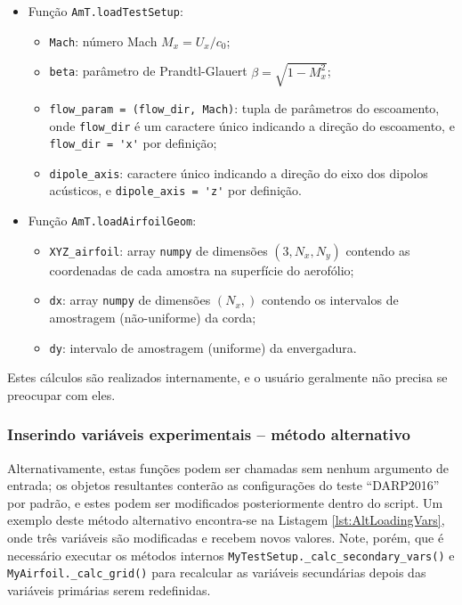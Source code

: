 \documentclass[a4paper, 11pt, twoside]{article}
\begin{document}
\begin{itemize}
	\item Função \verb|AmT.loadTestSetup|:
	
	\begin{itemize}
		\item \verb|Mach|: número Mach $M_x = U_x/c_0$;
		\item \verb|beta|: parâmetro de Prandtl-Glauert $\beta = \sqrt{1-M_x^2}$;
		\item \verb|flow_param = (flow_dir, Mach)|: tupla de parâmetros do escoamento, onde \verb|flow_dir| é um caractere único indicando a direção do escoamento, e \verb|flow_dir = 'x'| por definição;
		\item \verb|dipole_axis|: caractere único indicando a direção do eixo dos dipolos acústicos, e \verb|dipole_axis = 'z'| por definição.
	\end{itemize}
	
	\item Função \verb|AmT.loadAirfoilGeom|:
	\begin{itemize}
		\item \verb|XYZ_airfoil|: array \verb|numpy| de dimensões $(3, N_x, N_y)$ contendo as coordenadas de cada amostra na superfície do aerofólio;
		\item \verb|dx|: array \verb|numpy| de dimensões $(N_x,)$ contendo os intervalos de amostragem (não-uniforme) da corda;
		\item \verb|dy|: intervalo de amostragem (uniforme) da envergadura.
	\end{itemize}
\end{itemize}

Estes cálculos são realizados internamente, e o usuário geralmente não precisa se preocupar com eles.

\subsubsection{Inserindo variáveis experimentais -- método alternativo}

Alternativamente, estas funções podem ser chamadas sem nenhum argumento de entrada; os objetos resultantes conterão as configurações do teste ``DARP2016'' por padrão, e estes podem ser modificados posteriormente dentro do script. Um exemplo deste método alternativo encontra-se na Listagem \ref{lst:AltLoadingVars}, onde três variáveis são modificadas e recebem novos valores. Note, porém, que é necessário executar os métodos internos \verb|MyTestSetup._calc_secondary_vars()| e \verb|MyAirfoil._calc_grid()| para recalcular as variáveis secundárias depois das variáveis primárias serem redefinidas.
\end{document}
